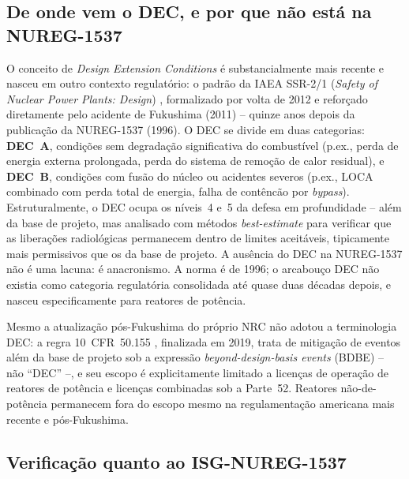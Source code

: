 \subsection*{De onde vem o DEC, e por que n\~ao est\'a na NUREG-1537}

O conceito de \emph{Design Extension Conditions} \'e substancialmente
mais recente e nasceu em outro contexto regulat\'orio: o padr\~ao da IAEA
SSR-2/1 (\emph{Safety of Nuclear Power Plants: Design}) \citep{iaeassr21},
formalizado por volta de 2012 e refor\c{c}ado diretamente pelo acidente de Fukushima
(2011) -- quinze anos depois da publica\c{c}\~ao da NUREG-1537 (1996). O
DEC se divide em duas categorias: \textbf{DEC~A}, condi\c{c}\~oes sem
degrada\c{c}\~ao significativa do combust\'ivel (p.ex., perda de energia
externa prolongada, perda do sistema de remo\c{c}\~ao de calor residual),
e \textbf{DEC~B}, condi\c{c}\~oes com fus\~ao do n\'ucleo ou acidentes
severos (p.ex., LOCA combinado com perda total de energia, falha de
cont\^enc\~ao por \emph{bypass}). Estruturalmente, o DEC ocupa os
n\'iveis~4 e~5 da defesa em profundidade -- al\'em da base de projeto,
mas analisado com m\'etodos \emph{best-estimate} para verificar que as
libera\c{c}\~oes radiol\'ogicas permanecem dentro de limites aceit\'aveis,
tipicamente mais permissivos que os da base de projeto. A aus\^encia do
DEC na NUREG-1537 n\~ao \'e uma lacuna: \'e anacronismo. A norma \'e de
1996; o arcabou\c{c}o DEC n\~ao existia como categoria regulat\'oria
consolidada at\'e quase duas d\'ecadas depois, e nasceu especificamente
para reatores de pot\^encia.

Mesmo a atualiza\c{c}\~ao p\'os-Fukushima do pr\'oprio NRC n\~ao adotou a
terminologia DEC: a regra 10~CFR~50.155 \citep{cfr10p50155}, finalizada em 2019, trata de
mitiga\c{c}\~ao de eventos al\'em da base de projeto sob a expressão
\emph{beyond-design-basis events} (BDBE) -- n\~ao ``DEC'' --, e seu
escopo \'e explicitamente limitado a licen\c{c}as de opera\c{c}\~ao de
reatores de pot\^encia e licen\c{c}as combinadas sob a Parte~52. Reatores
n\~ao-de-pot\^encia permanecem fora do escopo mesmo na regulamenta\c{c}\~ao
americana mais recente e p\'os-Fukushima.

\subsection*{Verifica\c{c}\~ao quanto ao ISG-NUREG-1537}

